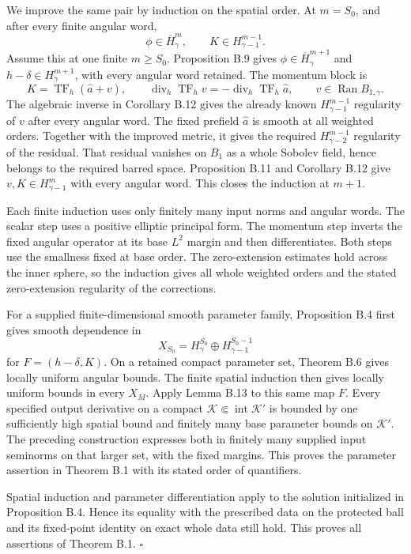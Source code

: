 \documentclass[
  english,
  11pt,
  reqno]{amsart}
\begin{document}
We improve the same pair by induction on the spatial order. At
\(m=S_0\), and after every finite angular word, \[
\phi\in\overline H^{m}_\gamma,
\qquad K\in H^{m-1}_{\gamma-1}.
\] Assume this at one finite \(m\ge S_0\). Proposition B.9 gives
\(\phi\in\overline H^{m+1}_\gamma\) and \(h-\delta\in H^{m+1}_\gamma\),
with every angular word retained. The momentum block is \[
K=\operatorname{TF}_h(\widehat a+v),
\qquad
\operatorname{div}_h\operatorname{TF}_h v
=-\operatorname{div}_h\operatorname{TF}_h\widehat a,
\qquad v\in\operatorname{Ran}B_{1,\gamma}.
\] The algebraic inverse in Corollary B.12 gives the already known
\(H^{m-1}_{\gamma-1}\) regularity of \(v\) after every angular word. The
fixed prefield \(\widehat a\) is smooth at all weighted orders. Together
with the improved metric, it gives the required \(H^{m-1}_{\gamma-2}\)
regularity of the residual. That residual vanishes on \(B_1\) as a whole
Sobolev field, hence belongs to the required barred space. Proposition
B.11 and Corollary B.12 give \(v,K\in H^m_{\gamma-1}\) with every
angular word. This closes the induction at \(m+1\).

Each finite induction uses only finitely many input norms and angular
words. The scalar step uses a positive elliptic principal form. The
momentum step inverts the fixed angular operator at its base \(L^2\)
margin and then differentiates. Both steps use the smallness fixed at
base order. The zero-extension estimates hold across the inner sphere,
so the induction gives all whole weighted orders and the stated
zero-extension regularity of the corrections.

For a supplied finite-dimensional smooth parameter family, Proposition
B.4 first gives smooth dependence in \[
X_{S_0}=H^{S_0}_\gamma\oplus H^{S_0-1}_{\gamma-1}
\] for \(F=(h-\delta,K)\). On a retained compact parameter set, Theorem
B.6 gives locally uniform angular bounds. The finite spatial induction
then gives locally uniform bounds in every \(X_M\). Apply Lemma B.13 to
this same map \(F\). Every specified output derivative on a compact
\(\mathcal K\Subset\operatorname{int}\mathcal K'\) is bounded by one
sufficiently high spatial bound and finitely many base parameter bounds
on \(\mathcal K'\). The preceding construction expresses both in
finitely many supplied input seminorms on that larger set, with the
fixed margins. This proves the parameter assertion in Theorem B.1 with
its stated order of quantifiers.

Spatial induction and parameter differentiation apply to the solution
initialized in Proposition B.4. Hence its equality with the prescribed
data on the protected ball and its fixed-point identity on exact whole
data still hold. This proves all assertions of Theorem B.1.
\hfill\(\square\)
\end{document}
